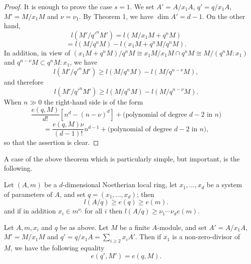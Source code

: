 \begin{proof}
It is enough to prove the case $s = 1$. We set $A' = A/x_1A$, $q' = q/x_1A$,
$M' = M/x_1M$ and $\nu = \nu_1$. By Theorem 1, we have $\dim A' = d - 1$. On the
other hand,
\[
  l(M'/q'^nM') = l(M/x_1M + q^nM)
\]
\[
  = l(M/q^nM) - l(x_1M + q^nM/q^nM).
\]
In addition, in view of $(x_1M + q^nM)/q^nM \cong x_1M/x_1M \cap q^nM \cong M/
(q^nM:x_1)$ and $q^{n-\nu}M \subset q^nM:x_1$, we have
\[
  l(M'/q'^nM') \ge l(M/q^nM) - l(M/q^{n-\nu}M),
\]
and therefore
\[
  l(M'/q'^nM') \ge l(M/q^nM) - l(M/q^{n-\nu}M).
\]
When $n \gg 0$ the right-hand side is of the form
\[
  \frac{e(q, M)}{d!}[n^d - (n - \nu)^d] + \text{(polynomial of degree } d - 2 \text{ in } n)
\]
\[
  = \frac{e(q, M)\nu}{(d-1)!}n^{d-1} + \text{(polynomial of degree } d - 2 \text{ in } n),
\]
so that the assertion is clear.
\end{proof}

A case of the above theorem which is particularly simple, but important,
is the following.

\begin{theorem}\label{thm:14.10}
Let $(A, m)$ be a $d$-dimensional Noetherian local ring, let
$x_1, \ldots, x_d$ be a system of parameters of $A$, and set $q = (x_1, \ldots, x_d)$; then
\[
  l(A/q) \ge e(q) \ge e(m).
\]
and if in addition $x_i \in m^{\nu_i}$ for all $i$ then $l(A/q) \ge \nu_1 \cdots \nu_d e(m)$.
\end{theorem}

\begin{theorem}\label{thm:14.11}
Let $A, m, x_i$ and $q$ be as above. Let $M$ be a finite $A$-module,
and set $A' = A/x_1A$, $M' = M/x_1M$ and $q' = q/x_1A = \sum_{i \ge 2} x_iA'$. Then if $x_1$ is a
non-zero-divisor of $M$, we have the following equality
\[
  e(q', M') = e(q, M).
\]
\end{theorem}

